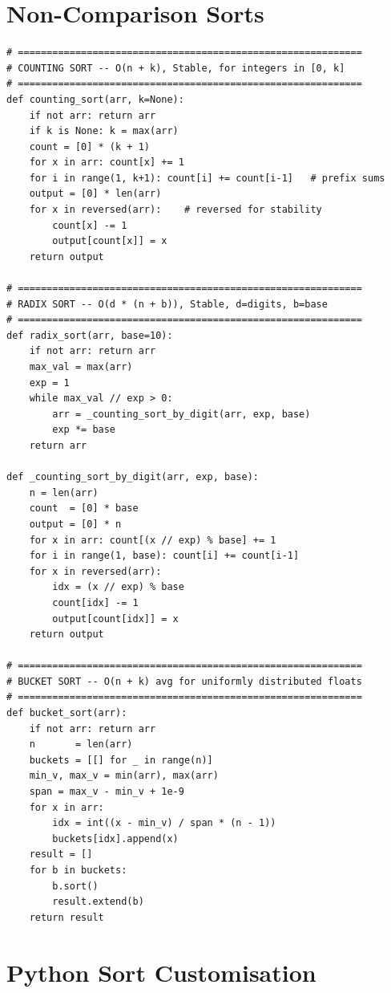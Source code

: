\documentclass[11pt,a4paper]{report}
\begin{document}
\section{Non-Comparison Sorts}

\begin{lstlisting}
# ============================================================
# COUNTING SORT -- O(n + k), Stable, for integers in [0, k]
# ============================================================
def counting_sort(arr, k=None):
    if not arr: return arr
    if k is None: k = max(arr)
    count = [0] * (k + 1)
    for x in arr: count[x] += 1
    for i in range(1, k+1): count[i] += count[i-1]   # prefix sums
    output = [0] * len(arr)
    for x in reversed(arr):    # reversed for stability
        count[x] -= 1
        output[count[x]] = x
    return output

# ============================================================
# RADIX SORT -- O(d * (n + b)), Stable, d=digits, b=base
# ============================================================
def radix_sort(arr, base=10):
    if not arr: return arr
    max_val = max(arr)
    exp = 1
    while max_val // exp > 0:
        arr = _counting_sort_by_digit(arr, exp, base)
        exp *= base
    return arr

def _counting_sort_by_digit(arr, exp, base):
    n = len(arr)
    count  = [0] * base
    output = [0] * n
    for x in arr: count[(x // exp) % base] += 1
    for i in range(1, base): count[i] += count[i-1]
    for x in reversed(arr):
        idx = (x // exp) % base
        count[idx] -= 1
        output[count[idx]] = x
    return output

# ============================================================
# BUCKET SORT -- O(n + k) avg for uniformly distributed floats
# ============================================================
def bucket_sort(arr):
    if not arr: return arr
    n       = len(arr)
    buckets = [[] for _ in range(n)]
    min_v, max_v = min(arr), max(arr)
    span = max_v - min_v + 1e-9
    for x in arr:
        idx = int((x - min_v) / span * (n - 1))
        buckets[idx].append(x)
    result = []
    for b in buckets:
        b.sort()
        result.extend(b)
    return result
\end{lstlisting}

\section{Python Sort Customisation}
\end{document}
